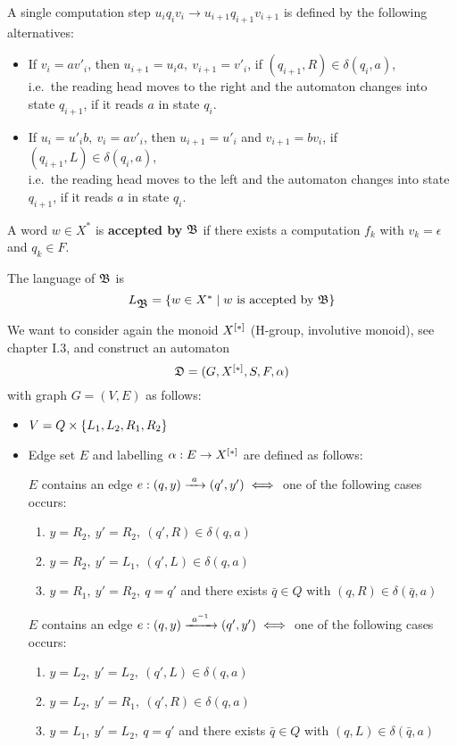 A single computation step $u_i q_i v_i \to u_{i+1} q_{i+1} v_{i+1}$ is defined
by the following alternatives:

\begin{itemize}
  \item If $v_i = a v'_i$, then $u_{i+1} = u_i a,\ v_{i+1} =
  v'_i$, if $(q_{i+1}, R) \in \delta(q_i, a)$,\\
  i.e.\ the reading head moves to the right and the automaton changes into state
  $q_{i+1}$, if it reads $a$ in state $q_i$.

	\item If $u_i = u'_i b,\ v_i = a v'_i$, then $u_{i+1} = u'_i$ and
	$v_{i+1} = b v_i$, if $(q_{i+1}, L) \in \delta(q_i, a)$,\\
	i.e.\ the reading head moves to the left and the automaton changes into state
	$q_{i+1}$, if it reads $a$ in state $q_i$.
\end{itemize}

\bigskip
\begin{definition}
A word $w \in X^*$ is {\bf accepted by} $\mbox{$\mathfrak{B}$}$ if there exists a computation
$f_k$ with $v_k = \epsilon$ and $q_k \in F$.
\end{definition}

The language of $\mbox{$\mathfrak{B}$}$ is
\[ L_{\mbox{$\mathfrak{B}$}} = \mbox{$\{w \in X^* \mid w\text{ is accepted by }\mbox{$\mathfrak{B}$}\}$} \]

\bigskip
We want to consider again the monoid $\mbox{${X}^{[*]}$}$ (H-group, involutive monoid),
see chapter I.3, and construct an automaton 
\[ \mbox{$\mathfrak{D}$} = (G, \mbox{${X}^{[*]}$}, S, F, \alpha) \]
with graph $G=(V, E)$ as follows:
\begin{itemize}
  \item $V = Q \times \mbox{$\{L_1, L_2, R_1, R_2\}$}$
  
  \item Edge set $E$ and labelling $\alpha: E \to \mbox{${X}^{[*]}$}$ are defined as
  follows:
  
  $E$ contains an edge $e: (q, y) \xrightarrow{\ {a}\ } (q', y') \iff$ one of the following
  cases occurs:
  \begin{enumerate}
    \item $y = R_2,\ y' = R_2,\ (q', R) \in \delta(q, a)$
    \item $y = R_2,\ y' = L_1,\ (q', L) \in \delta(q, a)$
    \item $y = R_1,\ y' = R_2,\ q = q'$ and there exists $\bar{q} \in Q$ with
    $(q, R) \in \delta(\bar{q}, a)$
  \end{enumerate}

  $E$ contains an edge $e: (q, y) \xrightarrow{\ {{{a}^{-1}}}\ } (q', y') \iff$ one of the
  following cases occurs:
  \begin{enumerate}
    \item $y = L_2,\ y' = L_2,\ (q', L) \in \delta(q, a)$
    \item $y = L_2,\ y' = R_1,\ (q', R) \in \delta(q, a)$
    \item $y = L_1,\ y' = L_2,\ q = q'$ and there exists $\bar{q} \in Q$ with
    $(q, L) \in \delta(\bar{q}, a)$
  \end{enumerate}
\end{itemize}


